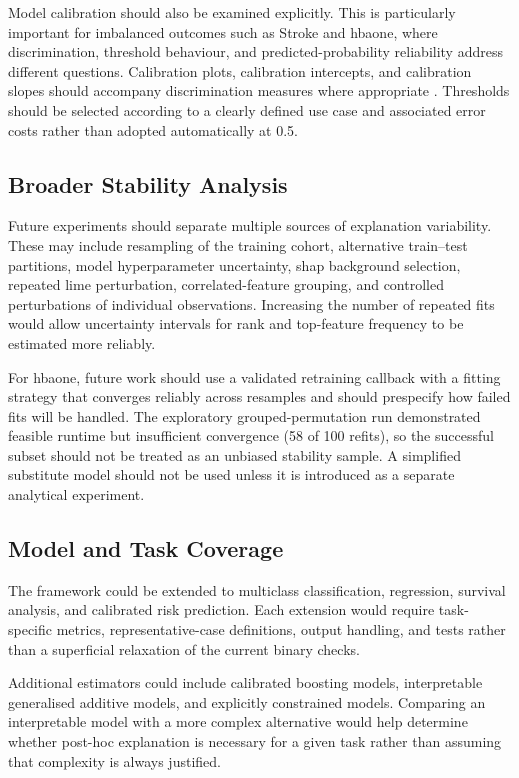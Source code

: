 Model calibration should also be examined explicitly. This is particularly important for imbalanced outcomes such as Stroke and \gls{hbaone}, where discrimination, threshold behaviour, and predicted-probability reliability address different questions. Calibration plots, calibration intercepts, and calibration slopes
should accompany discrimination measures where appropriate \citep{van_calster_calibration_2019}. Thresholds should be selected according to a clearly defined use case and associated error costs rather than adopted automatically at 0.5.

\subsection{Broader Stability Analysis}

Future experiments should separate multiple sources of explanation variability. These may include resampling of the training cohort, alternative train--test partitions, model hyperparameter uncertainty, \gls{shap} background selection, repeated \gls{lime} perturbation, correlated-feature grouping, and controlled perturbations of individual observations. Increasing the number of repeated fits would allow uncertainty intervals for rank and top-feature frequency to be estimated more reliably.

For \gls{hbaone}, future work should use a validated retraining callback with a fitting strategy that converges reliably across resamples and should prespecify how failed fits will be handled. The exploratory grouped-permutation run demonstrated feasible runtime but insufficient convergence (58 of 100 refits), so the successful subset should not be treated as an unbiased stability sample. A simplified substitute model should not be used unless it is introduced as a separate analytical experiment.

\subsection{Model and Task Coverage}

The framework could be extended to multiclass classification, regression, survival analysis, and calibrated risk prediction. Each extension would require task-specific metrics, representative-case definitions, output handling, and tests rather than a superficial relaxation of the current binary checks.

Additional estimators could include calibrated boosting models, interpretable generalised additive models, and explicitly constrained models. Comparing an interpretable model with a more complex alternative would help determine whether post-hoc explanation is necessary for a given task rather than assuming that complexity is always justified.

